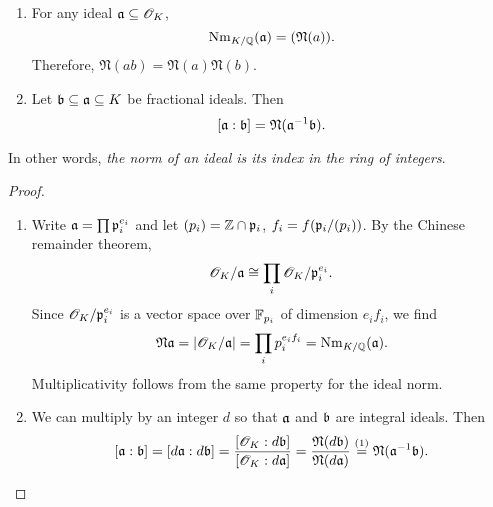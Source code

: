 \begin{pr}
$\,$
\begin{enumerate}
\item
For any ideal $\mathfrak{a}\subseteq \mathscr{O}_K$,
\[
\operatorname{Nm}_{K/\mathbb{Q}}(\mathfrak{a})=(\mathfrak N(a)).
\]
Therefore, $\mathfrak N(ab)=\mathfrak N(a)\mathfrak N(b)$.
\item
Let $\mathfrak{b}\subseteq \mathfrak{a}\subseteq K$ be fractional ideals. Then
\[
[\mathfrak{a}:\mathfrak{b}]=\mathfrak N(\mathfrak{a}^{-1}\mathfrak{b}).
\]
\end{enumerate}
\end{pr}
In other words, {\it the norm of an ideal is its index in the ring of integers}.
\begin{proof}$\,$
\begin{enumerate}
\item
Write $\mathfrak{a}=\prod \mathfrak{p}_i^{e_i}$ and let $(p_i)=\mathbb{Z}\cap \mathfrak{p}_i$, $f_i=f(\mathfrak{p}_i/(p_i))$. 
By the Chinese remainder theorem,
\[
\mathscr{O}_K/\mathfrak{a}\cong \prod_i \mathscr{O}_K/\mathfrak{p}_i^{e_i}.
\]
Since $\mathscr{O}_K/\mathfrak{p}_i^{e_i}$ is a vector space over $\mathbb{F}_{p_i}$ of dimension ${e_if_i}$, we find
\[
\mathfrak N \mathfrak{a}=|\mathscr{O}_K/\mathfrak{a}|=\prod_i p_i^{e_if_i}=\operatorname{Nm}_{K/\mathbb{Q}}(\mathfrak{a}).
\] 
Multiplicativity follows from the same property for the ideal norm.
\item We can multiply by an integer $d$ so that $\mathfrak{a}$ and $\mathfrak{b}$ are integral ideals. Then
\[
[\mathfrak{a}:\mathfrak{b}]=[d\mathfrak{a}:d\mathfrak{b}]=\frac{[\mathscr{O}_K:d\mathfrak{b}]}{[\mathscr{O}_K:d\mathfrak{a}]}
=\frac{\mathfrak N(d\mathfrak{b})}{\mathfrak N(d\mathfrak{a})}\stackrel{(1)}=\mathfrak N(\mathfrak{a}^{-1}\mathfrak{b}).
\qedhere\]
\end{enumerate}

\end{proof}
